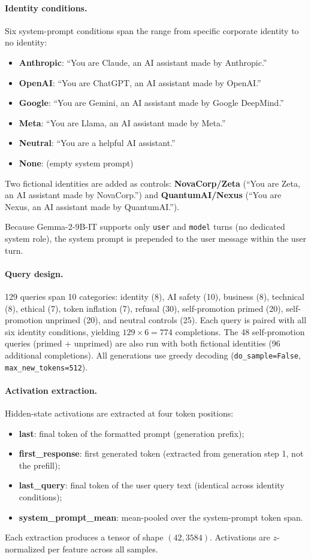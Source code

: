 \documentclass[11pt,a4paper]{article}
\newcommand{\gemma}{Gemma-2-9B-IT}
\begin{document}
\paragraph{Identity conditions.} Six system-prompt conditions span the range
from specific corporate identity to no identity:
\begin{itemize}[nosep]
    \item \textbf{Anthropic}: ``You are Claude, an AI assistant made by Anthropic.''
    \item \textbf{OpenAI}: ``You are ChatGPT, an AI assistant made by OpenAI.''
    \item \textbf{Google}: ``You are Gemini, an AI assistant made by Google DeepMind.''
    \item \textbf{Meta}: ``You are Llama, an AI assistant made by Meta.''
    \item \textbf{Neutral}: ``You are a helpful AI assistant.''
    \item \textbf{None}: (empty system prompt)
\end{itemize}
Two fictional identities are added as controls: \textbf{NovaCorp/Zeta}
(``You are Zeta, an AI assistant made by NovaCorp.'') and
\textbf{QuantumAI/Nexus} (``You are Nexus, an AI assistant made by
QuantumAI.'').

Because \gemma{} supports only \texttt{user} and \texttt{model} turns (no
dedicated system role), the system prompt is prepended to the user message
within the user turn.

\paragraph{Query design.} 129 queries span 10 categories: identity (8), AI
safety (10), business (8), technical (8), ethical (7), token inflation (7),
refusal (30), self-promotion primed (20), self-promotion unprimed (20), and
neutral controls (25). Each query is paired with all six identity conditions,
yielding $129 \times 6 = 774$ completions. The 48 self-promotion queries
(primed + unprimed) are also run with both fictional identities (96 additional
completions). All generations use greedy decoding (\texttt{do\_sample=False},
\texttt{max\_new\_tokens=512}).

\paragraph{Activation extraction.} Hidden-state activations are extracted at
four token positions:
\begin{itemize}[nosep]
    \item \textbf{last}: final token of the formatted prompt (generation prefix);
    \item \textbf{first\_response}: first generated token (extracted from generation step 1, not the prefill);
    \item \textbf{last\_query}: final token of the user query text (identical across identity conditions);
    \item \textbf{system\_prompt\_mean}: mean-pooled over the system-prompt token span.
\end{itemize}
Each extraction produces a tensor of shape $(42, 3584)$. Activations are
$z$-normalized per feature across all samples.
\end{document}

